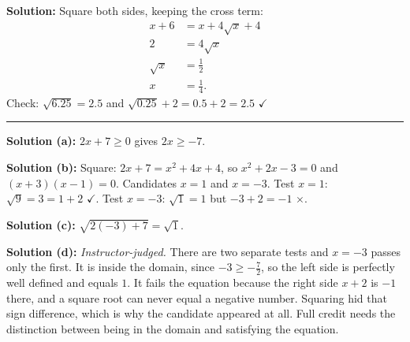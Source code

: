 \documentclass[12pt]{article}
\begin{document}

\textbf{Solution:} Square both sides, keeping the cross term:
\begin{align*}
  x + 6 &= x + 4\sqrt{x} + 4 \\
  2 &= 4\sqrt{x} \\
  \sqrt{x} &= \tfrac{1}{2} \\
  x &= \tfrac{1}{4} .
\end{align*}
Check: $\sqrt{6.25} = 2.5$ and $\sqrt{0.25} + 2 = 0.5 + 2 = 2.5$ $\checkmark$

\vspace{0.2cm}\noindent\rule{\linewidth}{0.2pt}\vspace{0.2cm}


\textbf{Solution (a):} $2x + 7 \ge 0$ gives $2x \ge -7$. 

\textbf{Solution (b):} Square: $2x + 7 = x^2 + 4x + 4$, so $x^2 + 2x - 3 = 0$ and
$(x+3)(x-1) = 0$. Candidates $x = 1$ and $x = -3$. Test $x = 1$:
$\sqrt{9} = 3 = 1 + 2$ $\checkmark$. Test $x = -3$: $\sqrt{1} = 1$ but
$-3 + 2 = -1$ $\times$. 

\textbf{Solution (c):} $\sqrt{2(-3)+7} = \sqrt{1}$. 

\textbf{Solution (d):} \emph{Instructor-judged.} There are two separate tests and
$x = -3$ passes only the first. It is inside the domain, since
$-3 \ge -\tfrac{7}{2}$, so the left side is perfectly well defined and equals
$1$. It fails the equation because the right side $x + 2$ is $-1$ there, and a
square root can never equal a negative number. Squaring hid that sign
difference, which is why the candidate appeared at all. Full credit needs the
distinction between being in the domain and satisfying the equation.
\end{document}
